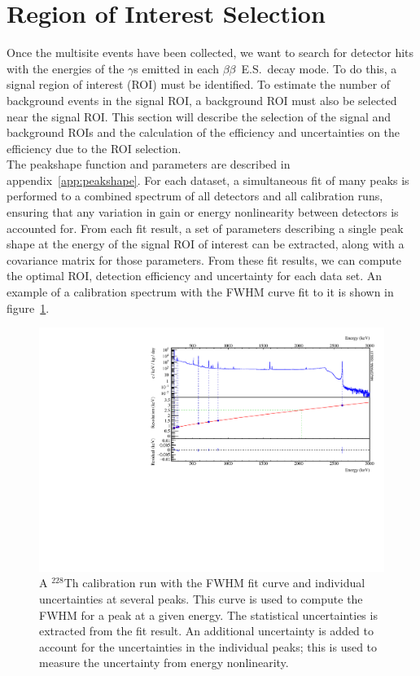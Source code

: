 \documentclass[notitlepage,rmp,aps,10pt]{revtex4-1}
\newcommand{\bb}{${\beta \beta}$}
\newcommand{\bbes}{\bb~E.S.}
\newcommand{\iso}[2]{$^{#1}$#2}
\newcommand{\Th}[1]{\iso{#1}{Th}}
\begin{document}
\section{Region of Interest Selection}
Once the multisite events have been collected, we want to search for detector hits with the energies of the $\gamma$s emitted in each \bbes\ decay mode.
To do this, a signal region of interest (ROI) must be identified.
To estimate the number of background events in the signal ROI, a background ROI must also be selected near the signal ROI.
This section will describe the selection of the signal and background ROIs and the calculation of the efficiency and uncertainties on the efficiency due to the ROI selection.
\\
The peakshape function and parameters are described in appendix~\ref{app:peakshape}.
For each dataset, a simultaneous fit of many peaks is performed to a combined spectrum of all detectors and all calibration runs, ensuring that any variation in gain or energy nonlinearity between detectors is accounted for.
From each fit result, a set of parameters describing a single peak shape at the energy of the signal ROI of interest can be extracted, along with a covariance matrix for those parameters.
From these fit results, we can compute the optimal ROI, detection efficiency and uncertainty for each data set.
An example of a calibration spectrum with the FWHM curve fit to it is shown in figure~\ref{fig:fwhmcal}.
\begin{figure}[h]
  \centering
  \includegraphics[width=.9\linewidth]{fwhmcal}
  \caption[FWHM extracted from a \Th{228} calibration spectrum]{\label{fig:fwhmcal}
    A \Th{228} calibration run with the FWHM fit curve and individual uncertainties at several peaks. This curve is used to compute the FWHM for a peak at a given energy. The statistical uncertainties is extracted from the fit result. An additional uncertainty is added to account for the uncertainties in the individual peaks; this is used to measure the uncertainty from energy nonlinearity.
  }
\end{figure}
\\
\end{document}
